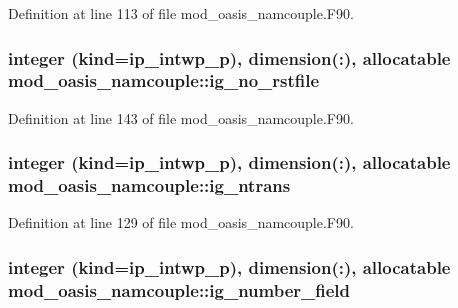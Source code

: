 Definition at line 113 of file mod\+\_\+oasis\+\_\+namcouple.\+F90.

\hypertarget{classmod__oasis__namcouple_a1cc3d37d7819c112f14b6cec03266561}{
\subsubsection[{ig\+\_\+no\+\_\+rstfile}]{\setlength{\rightskip}{0pt plus 5cm}integer (kind=ip\+\_\+intwp\+\_\+p), dimension(\+:), allocatable mod\+\_\+oasis\+\_\+namcouple\+::ig\+\_\+no\+\_\+rstfile\hspace{0.3cm}{\ttfamily [private]}}}\label{classmod__oasis__namcouple_a1cc3d37d7819c112f14b6cec03266561}


Definition at line 143 of file mod\+\_\+oasis\+\_\+namcouple.\+F90.

\hypertarget{classmod__oasis__namcouple_ac4549f9f5bbb37fce3edc9a208e0d48b}{
\subsubsection[{ig\+\_\+ntrans}]{\setlength{\rightskip}{0pt plus 5cm}integer (kind=ip\+\_\+intwp\+\_\+p), dimension(\+:), allocatable mod\+\_\+oasis\+\_\+namcouple\+::ig\+\_\+ntrans\hspace{0.3cm}{\ttfamily [private]}}}\label{classmod__oasis__namcouple_ac4549f9f5bbb37fce3edc9a208e0d48b}


Definition at line 129 of file mod\+\_\+oasis\+\_\+namcouple.\+F90.

\hypertarget{classmod__oasis__namcouple_a0751f74f7ce6520d8e860b9da14d1d9d}{
\subsubsection[{ig\+\_\+number\+\_\+field}]{\setlength{\rightskip}{0pt plus 5cm}integer (kind=ip\+\_\+intwp\+\_\+p), dimension(\+:), allocatable mod\+\_\+oasis\+\_\+namcouple\+::ig\+\_\+number\+\_\+field\hspace{0.3cm}{\ttfamily [private]}}}\label{classmod__oasis__namcouple_a0751f74f7ce6520d8e860b9da14d1d9d}


